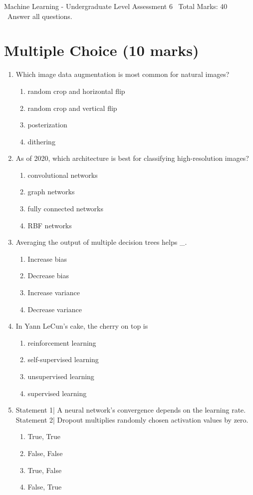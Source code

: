 \documentclass[12pt]{article}
\begin{document}
\begin{center}
Machine Learning - Undergraduate Level Assessment 6 \
Total Marks: 40 \
Answer all questions.
\end{center}

\section*{Multiple Choice (10 marks)}
\begin{enumerate}[label=\arabic*.]
\item Which image data augmentation is most common for natural images?
\begin{enumerate}[label=(\alph*)]
    \item random crop and horizontal flip
    \item random crop and vertical flip
    \item posterization
    \item dithering
\end{enumerate}
\item As of 2020, which architecture is best for classifying high-resolution images?
\begin{enumerate}[label=(\alph*)]
    \item convolutional networks
    \item graph networks
    \item fully connected networks
    \item RBF networks
\end{enumerate}
\item Averaging the output of multiple decision trees helps \_.
\begin{enumerate}[label=(\alph*)]
    \item Increase bias
    \item Decrease bias
    \item Increase variance
    \item Decrease variance
\end{enumerate}
\item In Yann LeCun's cake, the cherry on top is
\begin{enumerate}[label=(\alph*)]
    \item reinforcement learning
    \item self-supervised learning
    \item unsupervised learning
    \item supervised learning
\end{enumerate}
\item Statement 1| A neural network's convergence depends on the learning rate. Statement 2| Dropout multiplies randomly chosen activation values by zero.
\begin{enumerate}[label=(\alph*)]
    \item True, True
    \item False, False
    \item True, False
    \item False, True
\end{enumerate}
\end{enumerate}
\end{document}
